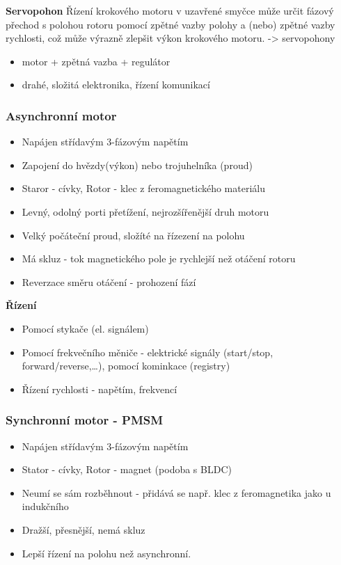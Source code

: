 \textbf{Servopohon}
Řízení krokového motoru v uzavřené smyčce může určit fázový přechod s polohou rotoru pomocí zpětné vazby polohy a (nebo) zpětné vazby rychlosti, což může výrazně zlepšit výkon krokového motoru. -> servopohony
\begin{itemize}
  \item motor + zpětná vazba + regulátor
  \item drahé, složitá elektronika, řízení komunikací
\end{itemize}

\subsubsection*{Asynchronní motor}
\begin{itemize}
  \item Napájen střídavým 3-fázovým napětím
  \item Zapojení do hvězdy(výkon) nebo trojuhelníka (proud)
  \item Staror - cívky, Rotor - klec z feromagnetického materiálu
  \item Levný, odolný porti přetížení, nejrozšířenější druh motoru
  \item Velký počáteční proud, složíté na řízezení na polohu
  \item Má skluz - tok magnetického pole je rychlejší než otáčení rotoru
  \item Reverzace směru otáčení - prohození fází
\end{itemize}

\textbf{Řízení}
\begin{itemize}
  \item Pomocí stykače (el. signálem)
  \item Pomocí frekvečního měniče - elektrické signály (start/stop, forward/reverse,\dots), pomocí kominkace (registry)
  \item Řízení rychlosti - napětím, frekvencí
\end{itemize}

\subsubsection*{Synchronní motor - PMSM}
\begin{itemize}
  \item Napájen střídavým 3-fázovým napětím
  \item Stator - cívky, Rotor - magnet (podoba s BLDC)
  \item Neumí se sám rozběhnout - přidává se např. klec z feromagnetika jako u indukčního
  \item Dražší, přesnější, nemá skluz
  \item Lepší řízení na polohu než asynchronní.
\end{itemize}


